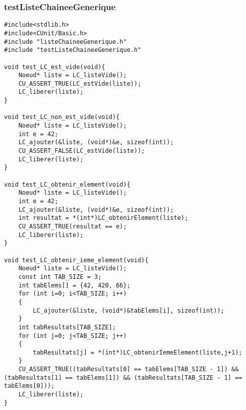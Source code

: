 \subsubsection{testListeChaineeGenerique}
\usepackage[T1]{fontenc}
\usepackage[english]{babel}
\usepackage{fullpage}
\usepackage{color}
\usepackage[table]{xcolor}
\usepackage{listings}
 
 
 

 
\begin{lstlisting}
#include<stdlib.h>
#include<CUnit/Basic.h>
#include "listeChaineeGenerique.h"
#include "testListeChaineeGenerique.h"

void test_LC_est_vide(void){
	Noeud* liste = LC_listeVide();
	CU_ASSERT_TRUE(LC_estVide(liste));
	LC_liberer(liste);
}

void test_LC_non_est_vide(void){
	Noeud* liste = LC_listeVide();
	int e = 42;
	LC_ajouter(&liste, (void*)&e, sizeof(int));
	CU_ASSERT_FALSE(LC_estVide(liste));
	LC_liberer(liste); 
}

void test_LC_obtenir_element(void){
	Noeud* liste = LC_listeVide();
	int e = 42;
	LC_ajouter(&liste, (void*)&e, sizeof(int));
	int resultat = *(int*)LC_obtenirElement(liste);
	CU_ASSERT_TRUE(resultat == e);
	LC_liberer(liste);
}

void test_LC_obtenir_ieme_element(void){
	Noeud* liste = LC_listeVide();
	const int TAB_SIZE = 3;
	int tabElems[] = {42, 420, 66};
	for (int i=0; i<TAB_SIZE; i++)
	{
		LC_ajouter(&liste, (void*)&tabElems[i], sizeof(int));
	}
	int tabResultats[TAB_SIZE];
	for (int j=0; j<TAB_SIZE; j++)
	{
		tabResultats[j] = *(int*)LC_obtenirIemeElement(liste,j+1);
	}
	CU_ASSERT_TRUE((tabResultats[0] == tabElems[TAB_SIZE - 1]) && (tabResultats[1] == tabElems[1]) && (tabResultats[TAB_SIZE - 1] == tabElems[0]));
	LC_liberer(liste);
}
\end{lstlisting}
 
